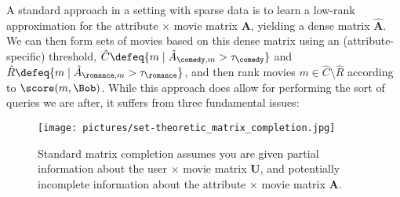 A standard approach in a setting with sparse data is to learn a low-rank approximation for the {attribute $\times$ movie} matrix $\mathbf A$, yielding a dense matrix $\hat {\mathbf A}$. We can then form sets of movies based on this dense matrix using an (attribute-specific) threshold, \eg $\hat C \defeq \{m \mid \hat A_{\comedy, m} > \tau_\comedy\}$ and $\hat R \defeq \{m \mid \hat A_{\romance, m} > \tau_\romance\}$, and then rank movies $m \in \hat C \setminus \hat R$ according to $\score(m, \Bob)$. While this approach does allow for performing the sort of queries we are after, it suffers from three fundamental issues:

\begin{figure}[]
    \centering
    \texttt{[image: pictures/set-theoretic\_matrix\_completion.jpg]}
    \caption{Standard matrix completion assumes you are given partial information about the user $\times$ movie matrix $\mathbf U$, and potentially incomplete information about the attribute $\times$ movie matrix $\mathbf A$.}
    \label{fig:set_theoretic_mc}
\end{figure}

